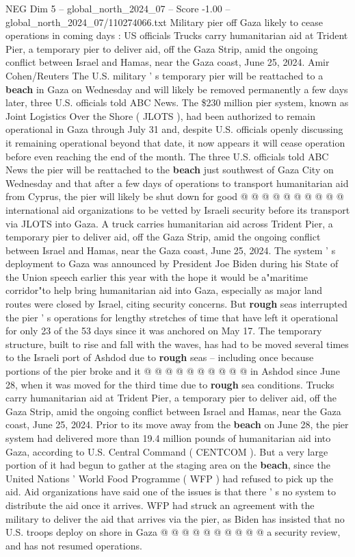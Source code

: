 \begin{textsample}{NEG Dim 5 – global\_north\_2024\_07 – Score -1.00 – global\_north\_2024\_07/110274066.txt}  \label{ex:f5_neg_155}
Military pier off Gaza likely to cease operations in coming days : US officials Trucks carry humanitarian aid at Trident Pier, a temporary pier to deliver aid, off the Gaza Strip, amid the ongoing conflict between Israel and Hamas, near the Gaza coast, June 25, 2024.
Amir Cohen/Reuters The U.S. military ' s temporary pier will be reattached to a \textbf{beach} in Gaza on Wednesday and will likely be removed permanently a few days later, three U.S. officials told ABC News.
The \$230 million pier system, known as Joint Logistics Over the Shore ( JLOTS ), had been authorized to remain operational in Gaza through July 31 and, despite U.S. officials openly discussing it remaining operational beyond that date, it now appears it will cease operation before even reaching the end of the month.
The three U.S. officials told ABC News the pier will be reattached to the \textbf{beach} just southwest of Gaza City on Wednesday and that after a few days of operations to transport humanitarian aid from Cyprus, the pier will likely be shut down for good @ @ @ @ @ @ @ @ @ @ international aid organizations to be vetted by Israeli security before its transport via JLOTS into Gaza.
A truck carries humanitarian aid across Trident Pier, a temporary pier to deliver aid, off the Gaza Strip, amid the ongoing conflict between Israel and Hamas, near the Gaza coast, June 25, 2024.
The system ' s deployment to Gaza was announced by President Joe Biden during his State of the Union speech earlier this year with the hope it would be a"maritime corridor"to help bring humanitarian aid into Gaza, especially as major land routes were closed by Israel, citing security concerns.
But \textbf{rough} seas interrupted the pier ' s operations for lengthy stretches of time that have left it operational for only 23 of the 53 days since it was anchored on May 17.
The temporary structure, built to rise and fall with the waves, has had to be moved several times to the Israeli port of Ashdod due to \textbf{rough} seas -- including once because portions of the pier broke and it @ @ @ @ @ @ @ @ @ @ in Ashdod since June 28, when it was moved for the third time due to \textbf{rough} sea conditions.
Trucks carry humanitarian aid at Trident Pier, a temporary pier to deliver aid, off the Gaza Strip, amid the ongoing conflict between Israel and Hamas, near the Gaza coast, June 25, 2024.
Prior to its move away from the \textbf{beach} on June 28, the pier system had delivered more than 19.4 million pounds of humanitarian aid into Gaza, according to U.S.
Central Command ( CENTCOM ).
But a very large portion of it had begun to gather at the staging area on the \textbf{beach}, since the United Nations ' World Food Programme ( WFP ) had refused to pick up the aid.
Aid organizations have said one of the issues is that there ' s no system to distribute the aid once it arrives.
WFP had struck an agreement with the military to deliver the aid that arrives via the pier, as Biden has insisted that no U.S. troops deploy on shore in Gaza @ @ @ @ @ @ @ @ @ @ a security review, and has not resumed operations.

\end{textsample}
